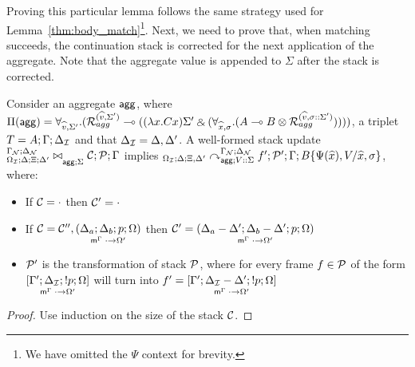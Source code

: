 Proving this particular lemma follows the same strategy used for
Lemma~\ref{thm:body_match}\footnote{We have omitted the $\Psi$ context for
brevity.}. Next, we need to prove that, when matching succeeds, the
continuation stack is corrected for the next application of the aggregate.  Note
that the aggregate value is appended to $\Sigma$ after the stack is corrected.

\begin{theorem}\label{thm:agg_from_update_to_derivation}
Consider an aggregate $\m{agg}$, where $\Pi(\m{agg}) = \forall_{\widehat{v}, \Sigma'}.
   (\defstwo{agg}{\widehat{v}}{\Sigma'} \lolli ((\lambda x. C x)\Sigma' \with (\forall_{\widehat{x}, \sigma}.
                                                (A \lolli B \otimes
                                                 \defstwo{agg}{\widehat{v}}{\sigma
                                                 ::\Sigma'}))))$,
a triplet $T = A; \Gamma; \deltan$ and that $\deltan = \Delta,
  \Delta'$.
A well-formed stack update
$\fixstatea{\Delta}{\Xi; \Delta'}{\lstack{C}; \lstack{P}}{\Gamma}{\Sigma}$
implies
$\derstatea{\Delta}{\Xi, \Delta'}{\gammanew}{\deltanew}{V :: \Sigma}{f';
   \lstack{P'}}{B\{\Psi(\widehat{x}), V / \widehat{x}, \sigma\}}$,
where:

\begin{itemize}[leftmargin=*]
   \item If $\lstack{C} = \cdot$ then $\lstack{C'} = \cdot$

   \item If $\lstack{C} = \lstack{C''},
   \lframe{\Delta_a}{\Delta_b}{p}{\Omega}{\cdot}{\Omega'}$
   then $\lstack{C'} = \lframe{\Delta_a - \Delta'}{\Delta_b -
      \Delta'}{p}{\Omega}{\cdot}{\Omega'}$

   \item $\lstack{P'}$ is the transformation of stack $\lstack{P}$, where for every frame $f \in
   \lstack{P}$ of the form $\pframe{\Gamma'}{\deltan}{\bang
      p}{\Omega}{\cdot}{\Omega'}$
   will turn into $f' = \pframe{\Gamma'}{\deltan-\Delta'}{\bang
      p}{\Omega}{\cdot}{\Omega'}$

\end{itemize}
\end{theorem}
\begin{proof}
Use induction on the size of the stack $\lstack{C}$.
\end{proof}


